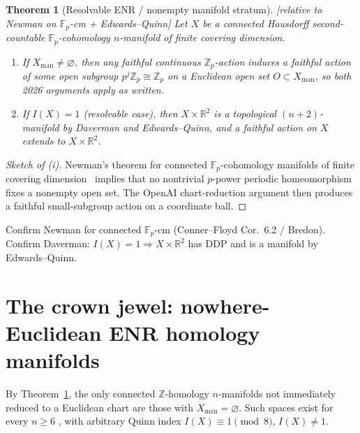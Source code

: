 \documentclass[11pt]{article}
\newtheorem{theorem}{Theorem}[section]
\theoremstyle{definition}
\newcommand{\status}[1]{\textit{\textcolor{black!70}{[#1]}}}
\begin{document}
\begin{theorem}[Resolvable ENR / nonempty manifold stratum]
\label{thm:D}
\status{relative to Newman on $\mathbb{F}_p$-cm + Edwards--Quinn}
Let $X$ be a connected Hausdorff second-countable $\mathbb{F}_p$-cohomology
$n$-manifold of finite covering dimension.
\begin{enumerate}[label=(\roman*)]
\item If $X_{\mathrm{man}}\neq\varnothing$, then any faithful continuous
$\mathbb{Z}_p$-action induces a faithful action of some open subgroup
$p^j\mathbb{Z}_p\cong\mathbb{Z}_p$ on a Euclidean open set
$O\subset X_{\mathrm{man}}$, so both 2026 arguments apply as written.
\item If $I(X)=1$ (resolvable case), then $X\times\mathbb{R}^2$ is a
topological $(n+2)$-manifold by Daverman and Edwards--Quinn, and a faithful
action on $X$ extends to $X\times\mathbb{R}^2$.
\end{enumerate}
\end{theorem}

\begin{proof}[Sketch of (i)]
Newman's theorem for connected $\mathbb{F}_p$-cohomology manifolds of finite
covering dimension~\cite{smith1941,connerfloyd1959} implies that no nontrivial
$p$-power periodic homeomorphism fixes a nonempty open set.  The OpenAI
chart-reduction argument then produces a faithful small-subgroup action on a
coordinate ball.
\end{proof}

\begin{checkboxenv}
Confirm Newman for connected $\mathbb{F}_p$-cm (Conner--Floyd Cor.~6.2 / Bredon).
Confirm Daverman: $I(X)=1\Rightarrow X\times\mathbb{R}^2$ has DDP and is a
manifold by Edwards--Quinn.
\end{checkboxenv}

\section{The crown jewel: nowhere-Euclidean ENR homology manifolds}
\label{sec:hm5}

By Theorem~\ref{thm:D}, the only connected $\mathbb{Z}$-homology $n$-manifolds
not immediately reduced to a Euclidean chart are those with
$X_{\mathrm{man}}=\varnothing$.  Such spaces exist for every $n\ge 6$
\cite{bfmw1996}, with arbitrary Quinn index $I(X)\equiv 1\pmod{8}$,
$I(X)\neq 1$.
\end{document}
